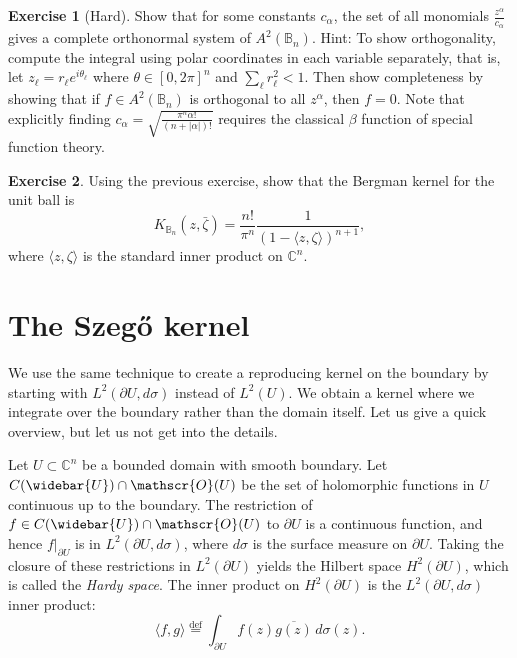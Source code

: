 \documentclass[12pt,openany]{book}
\newcommand{\linnprod}[2]{\langle #1 , #2 \rangle}
\newcommand{\abs}[1]{\left\lvert {#1} \right\rvert}
\newcommand{\C}{{\mathbb{C}}}
\newcommand{\bB}{{\mathbb{B}}}
\newcommand{\sO}{{\mathscr{O}}}
\newcommand{\myindex}[1]{#1\index{#1}}
\theoremstyle{plain}
\theoremstyle{remark}
\theoremstyle{definition}
\newenvironment{exbox}{%
    \def\FrameCommand{\vrule width 1pt \relax\hspace{10pt}}%
    \MakeFramed{\advance\hsize-\width\FrameRestore}%
}{%
    \endMakeFramed
}
\theoremstyle{exercise}
\newtheorem{exercise}{Exercise}[section]
\theoremstyle{example}
\begin{document}
\begin{exbox}
\begin{exercise}[Hard]
Show that for
some constants $c_\alpha$,
the set of all monomials $\frac{z^\alpha}{c_\alpha}$ gives a complete orthonormal
system of $A^2(\bB_n)$.  Hint: To show orthogonality,
compute the integral using polar coordinates in each variable
separately, that is, let $z_\ell = r_\ell e^{i\theta_\ell}$ where $\theta \in
[0,2\pi]^n$ and $\sum_\ell r_\ell^2 < 1$.  Then show completeness by showing that
if $f \in A^2(\bB_n)$ is orthogonal to all $z^\alpha$, then $f = 0$.
Note that explicitly finding $c_\alpha = \sqrt{\frac{\pi^n \alpha!}{(n+\abs{\alpha})!}}$ requires
the classical $\beta$ function of special function theory.
\end{exercise}

\begin{exercise}
Using the previous exercise, show that the Bergman kernel for the unit ball
is
\begin{equation*}
K_{\bB_n}(z,\bar{\zeta}) =
\frac{n!}{\pi^n}\frac{1}{{(1-\linnprod{z}{\zeta})}^{n+1}},
\end{equation*}
where $\linnprod{z}{\zeta}$ is the standard inner product on $\C^n$.
\end{exercise}
\end{exbox}


\section{The Szeg{\H{o}} kernel}

We use the same technique to create a reproducing kernel on the
boundary by starting with $L^2(\partial U, d\sigma)$ instead of $L^2(U)$.
We obtain a
kernel where we integrate over the boundary rather than the domain itself.
Let us give a quick overview, but let us not get into the details.

Let $U \subset \C^n$ be a bounded domain with smooth boundary.  Let
$C(\widebar{U}) \cap \sO(U)$ be the set of holomorphic functions in $U$
continuous up to the boundary.  The restriction of
$f \in C(\widebar{U}) \cap \sO(U)$ to $\partial U$ is a continuous
function,
and hence $f|_{\partial U}$ is in $L^2(\partial U,d\sigma)$, where $d\sigma$
is the surface measure on $\partial U$.
Taking the closure
of these restrictions in $L^2(\partial U)$ yields the Hilbert space
$H^2(\partial U)$,
%
which is called the \emph{\myindex{Hardy space}}.
The inner product on $H^2(\partial U)$ is the $L^2(\partial U,
d\sigma)$ inner product:
\begin{equation*}
\linnprod{f}{g} \overset{\text{def}}{=} \int_{\partial U} f(z)
\overline{g(z)} \, d\sigma(z) .
\end{equation*}
\end{document}
